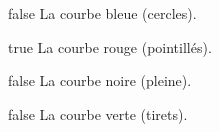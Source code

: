         \begin{reponses}
            \item[false] La courbe bleue (cercles).
		    \item[true] La courbe rouge (pointillés).
		    \item[false] La courbe noire (pleine).
		    \item[false] La courbe verte (tirets).
		    \end{reponses}
